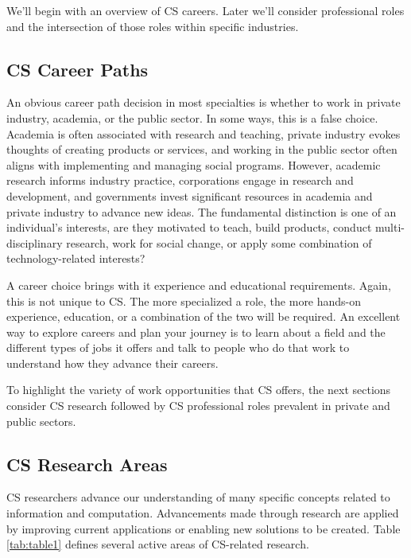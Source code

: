 We'll begin with an overview of CS careers. Later we'll consider professional roles and the intersection of those roles within specific industries.


\subsection{CS Career Paths}

An obvious career path decision in most specialties is whether to work in private industry, academia, or the public sector. In some ways, this is a false choice. Academia is often associated with research and teaching, private industry evokes thoughts of creating products or services, and working in the public sector often aligns with implementing and managing social programs. However, academic research informs industry practice, corporations engage in research and development, and governments invest significant resources in academia and private industry to advance new ideas. The fundamental distinction is one of an individual's interests, are they motivated to teach, build products, conduct multi-disciplinary research, work for social change, or apply some combination of technology-related interests?

A career choice brings with it experience and educational requirements. Again, this is not unique to CS. The more specialized a role, the more hands-on experience, education, or a combination of the two will be required. An excellent way to explore careers and plan your journey is to learn about a field and the different types of jobs it offers and talk to people who do that work to understand how they advance their careers. 

To highlight the variety of work opportunities that CS offers, the next sections consider CS research followed by CS professional roles prevalent in private and public sectors. 


\subsection{CS Research Areas}

CS researchers advance our understanding of many specific concepts related to information and computation. Advancements made through research are applied by improving current applications or enabling new solutions to be created. Table \ref{tab:table1} defines several active areas of CS-related research.

